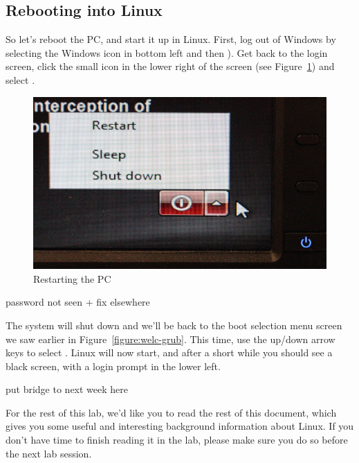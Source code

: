 \subsection{Rebooting into Linux}
\label{sec:rebooting-into-linux}

So let's reboot the PC, and start it up in Linux. First, log out of
Windows by selecting the Windows icon in bottom left and then ). Get back to the login screen, click the
small icon in the lower right of the screen (see Figure~\ref{figure:welc-restart}) and select .

\begin{figure}
\centerline{\includegraphics[width=15cm]{images/TH-shutdown-win}}
\caption{Restarting the PC}
\label{figure:welc-restart}
\end{figure}

\begin{note}
password not seen + fix elsewhere
\end{note}

The system will shut down and we'll be back to the boot selection menu
screen we saw earlier in Figure~\ref{figure:welc-grub}. This time, use
the up/down arrow keys to select . Linux will now start, and
after a short while you should see a black screen, with a login prompt
in the lower left. 

\begin{note}
put bridge to next week here
\end{note}

For the rest of this lab, we'd like you to read the rest of this
document, which gives you some useful and interesting background
information about Linux. If you don't have time to finish reading it in the lab, please make sure you do so before the next lab session.

